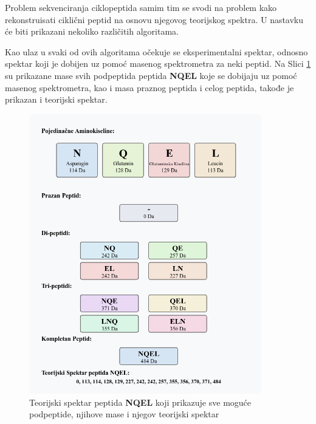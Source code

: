 \documentclass[12pt,oneside]{memoir}
\begin{document}
Problem sekvenciranja ciklopeptida samim tim se svodi na problem kako rekonstruisati ciklični peptid na osnovu njegovog teorijskog spektra. U nastavku će biti prikazani nekoliko različitih algoritama.

Kao ulaz u svaki od ovih algoritama očekuje se eksperimentalni spektar, odnosno spektar koji je dobijen uz pomoć masenog spektrometra za neki peptid. Na Slici \ref{fig:spektar} su prikazane mase svih podpeptida peptida \textbf{NQEL} koje se dobijaju uz pomoć masenog spektrometra, kao i masa praznog peptida i celog peptida, takođe je prikazan i teorijski spektar.

\begin{figure}[h]
  \centering
  \includegraphics[width=0.9\textwidth]{images/peptide-theoretical-spectrum.png}
  \caption{Teorijski spektar peptida \textbf{NQEL} koji prikazuje sve moguće podpeptide, njihove mase i njegov teorijski spektar}
  \label{fig:spektar}
\end{figure}


\end{document}
